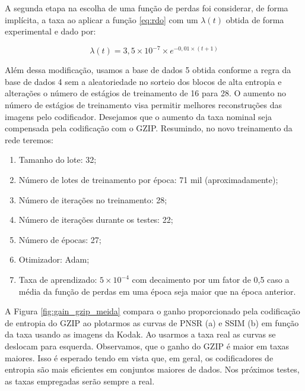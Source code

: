A segunda etapa na escolha de uma função de perdas foi considerar, de forma implícita, a taxa ao aplicar a função \ref{eq:rdo} com um $\lambda(t)$ obtida de forma experimental e dado por: 

\begin{equation}
\lambda(t) = 3,5 \times 10^{-7} \times e^{-0,01 \times (t+1)}  
\end{equation}

Além dessa modificação, usamos a base de dados 5 obtida conforme a regra da base de dados 4 sem a aleatoriedade no sorteio dos blocos de alta entropia e alterações o número de estágios de treinamento de 16 para 28. O aumento no número de estágios de treinamento visa permitir melhores reconstruções das imagens pelo codificador. Desejamos que o aumento da taxa nominal seja compensada pela codificação com o GZIP.  Resumindo, no novo treinamento da rede teremos: 

\begin{enumerate}
	\label{enum:hiper_param2}
	\item Tamanho do lote: 32;  
	\item Número de lotes de treinamento por época: 71 mil (aproximadamente);   
	\item Número de iterações no treinamento: 28;
	\item Número de iterações durante os testes: 22;
	\item Número de épocas: 27;
	\item Otimizador: Adam;
	\item Taxa de aprendizado: $5 \times {10}^{-4}$ com decaimento por um fator de 0,5 caso a média da função de perdas em uma época seja maior que na época anterior.
\end{enumerate}
A Figura \ref{fig:gain_gzip_meida} compara o ganho proporcionado pela codificação de entropia do GZIP ao plotarmos as curvas de PNSR (a) e SSIM (b) em função da taxa usando as imagens da Kodak. Ao usarmos a taxa real as curvas se deslocam para esquerda. Observamos, que o ganho do GZIP é maior em taxas maiores. Isso é esperado tendo em vista que, em geral, os codificadores de entropia são mais eficientes em conjuntos maiores de dados. Nos próximos testes, as taxas empregadas serão sempre a real.    

